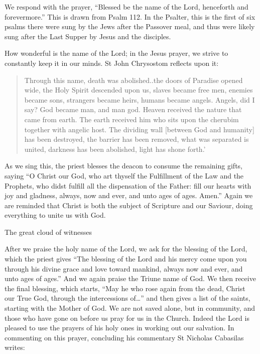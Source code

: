 \documentclass[
]{article}
\begin{document}
We respond with the prayer, ``Blessed be the name of the Lord,
henceforth and forevermore.'' This is drawn from Psalm 112. In the
Psalter, this is the first of six psalms there were sung by the Jews
after the Passover meal, and thus were likely sung after the Last Supper
by Jesus and the disciples.

How wonderful is the name of the Lord; in the Jesus prayer, we strive to
constantly keep it in our minds. St John Chrysostom reflects upon it:

\begin{quote}
Through this name, death was abolished..the doors of Paradise opened
wide, the Holy Spirit descended upon us, slaves became free men, enemies
became sons, strangers became heirs, humans became angels. Angels, did I
say? God became man, and man god. Heaven received the nature that came
from earth. The earth received him who sits upon the cherubim together
with angelic host. The dividing wall {[}between God and humanity{]} has
been destroyed, the barrier has been removed, what was separated is
united, darkness has been abolished, light has shone forth.'
\end{quote}

As we sing this, the priest blesses the deacon to consume the remaining
gifts, saying ``O Christ our God, who art thyself the Fulfillment of the
Law and the Prophets, who didst fulfill all the dispensation of the
Father: fill our hearts with joy and gladness, always, now and ever, and
unto ages of ages. Amen.'' Again we are reminded that Christ is both the
subject of Scripture and our Saviour, doing everything to unite us with
God.

The great cloud of witnesses

After we praise the holy name of the Lord, we ask for the blessing of
the Lord, which the priest gives ``The blessing of the Lord and his
mercy come upon you through his divine grace and love toward mankind,
always now and ever, and unto ages of ages.'' And we again praise the
Triune name of God. We then receive the final blessing, which starts,
``May he who rose again from the dead, Christ our True God, through the
intercessions of\ldots{}'' and then gives a list of the saints, starting
with the Mother of God. We are not saved alone, but in community, and
those who have gone on before us pray for us in the Church. Indeed the
Lord is pleased to use the prayers of his holy ones in working out our
salvation. In commenting on this prayer, concluding his commentary St
Nicholas Cabasilas writes:
\end{document}
